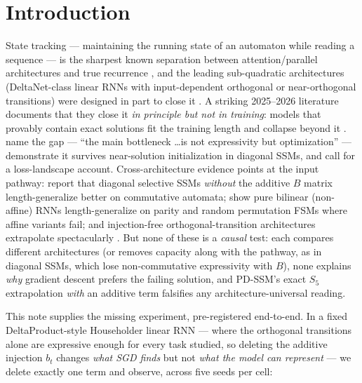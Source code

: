 \documentclass[10pt]{article}
\newcommand{\bt}{b_t}
\begin{document}
\section{Introduction}
State tracking --- maintaining the running state of an automaton while reading a sequence --- is the
sharpest known separation between attention/parallel architectures and true recurrence
\citep{merrill2024illusion,deletang2023chomsky}, and the leading sub-quadratic architectures
(DeltaNet-class linear RNNs with input-dependent orthogonal or near-orthogonal transitions) were
designed in part to close it \citep{grazzi2025negative,siems2025deltaproduct}. A striking 2025--2026
literature documents that they close it \emph{in principle but not in training}: models that provably
contain exact solutions fit the training length and collapse beyond it
\citep{shakerinava2026diagonal,mishra2026m2rnn,chung2026error,deletang2023chomsky}.
\citet{shakerinava2026diagonal} name the gap --- ``the main bottleneck \ldots is not expressivity but
optimization'' --- demonstrate it survives near-solution initialization in diagonal SSMs, and call for
a loss-landscape account. Cross-architecture evidence points at the input pathway:
\citet{terzic2025sdssm} report that diagonal selective SSMs \emph{without} the additive $B$ matrix
length-generalize better on commutative automata; \citet{ebrahimi2025bilinear} show pure bilinear
(non-affine) RNNs length-generalize on parity and random permutation FSMs where affine variants fail;
and injection-free orthogonal-transition architectures extrapolate spectacularly
\citep{sung2026holonomic,lee2026falsifier}. But none of these is a \emph{causal} test: each compares
different architectures (or removes capacity along with the pathway, as in diagonal SSMs, which lose
non-commutative expressivity with $B$), none explains \emph{why} gradient descent prefers the failing
solution, and PD-SSM's exact $S_5$ extrapolation \emph{with} an additive term \citep{terzic2025pdssm}
falsifies any architecture-universal reading.

This note supplies the missing experiment, pre-registered end-to-end. In a fixed
DeltaProduct-style Householder linear RNN --- where the orthogonal transitions alone are expressive
enough for every task studied, so deleting the additive injection $\bt$ changes \emph{what SGD finds}
but not \emph{what the model can represent} --- we delete exactly one term and observe, across five
seeds per cell:
\end{document}
